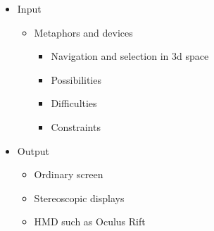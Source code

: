 \begin{itemize}
	\item Input
	\begin{itemize}
		\item Metaphors and devices
		\begin{itemize}
			\item Navigation and selection in 3d space
			\item Possibilities
			\item Difficulties
			\item Constraints
		\end{itemize}
	\end{itemize}
	\item Output
	\begin{itemize}
		\item Ordinary screen
		\item Stereoscopic displays
		\item \ac{HMD} such as Oculus Rift
	\end{itemize}
\end{itemize}
